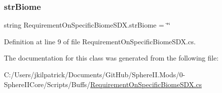 \subsubsection{\texorpdfstring{strBiome}{strBiome}}
{\footnotesize\ttfamily string Requirement\+On\+Specific\+Biome\+S\+D\+X.\+str\+Biome = \char`\"{}\char`\"{}}



Definition at line 9 of file Requirement\+On\+Specific\+Biome\+S\+D\+X.\+cs.



The documentation for this class was generated from the following file\+:\begin{DoxyCompactItemize}
\item 
C\+:/\+Users/jkilpatrick/\+Documents/\+Git\+Hub/\+Sphere\+I\+I.\+Mods/0-\/\+Sphere\+I\+I\+Core/\+Scripts/\+Buffs/\mbox{\hyperlink{_requirement_on_specific_biome_s_d_x_8cs}{Requirement\+On\+Specific\+Biome\+S\+D\+X.\+cs}}\end{DoxyCompactItemize}

